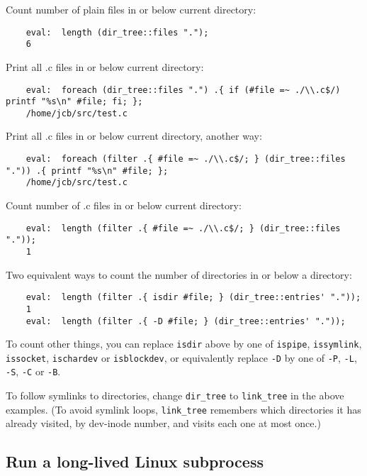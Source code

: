 Count number of plain files in or below current directory:
\begin{verbatim}
    eval:  length (dir_tree::files ".");
    6
\end{verbatim}

Print all .c files in or below current directory:
\begin{verbatim}
    eval:  foreach (dir_tree::files ".") .{ if (#file =~ ./\\.c$/) printf "%s\n" #file; fi; };
    /home/jcb/src/test.c
\end{verbatim}

Print all .c files in or below current directory, another way:
\begin{verbatim}
    eval:  foreach (filter .{ #file =~ ./\\.c$/; } (dir_tree::files ".")) .{ printf "%s\n" #file; };
    /home/jcb/src/test.c
\end{verbatim}

Count number of .c files in or below current directory:
\begin{verbatim}
    eval:  length (filter .{ #file =~ ./\\.c$/; } (dir_tree::files "."));
    1
\end{verbatim}

Two equivalent ways to count the number of 
directories in or below a directory:
\begin{verbatim}
    eval:  length (filter .{ isdir #file; } (dir_tree::entries' "."));
    1
    eval:  length (filter .{ -D #file; } (dir_tree::entries' "."));
\end{verbatim}

To count other things, you can replace {\tt isdir} above by one of 
{\tt ispipe}, 
{\tt issymlink}, 
{\tt issocket}, 
{\tt ischardev} or 
{\tt isblockdev}, or equivalently replace {\tt -D} by one of 
{\tt -P}, 
{\tt -L}, 
{\tt -S}, 
{\tt -C} or 
{\tt -B}.

To follow symlinks to directories, change {\tt dir\_tree} to 
{\tt link\_tree} in the above examples.  (To avoid symlink 
loops, {\tt link\_tree} remembers which directories it has 
already visited, by dev-inode number, and visits each one at 
most once.)


\cutend*

\subsection{Run a long-lived Linux subprocess}


